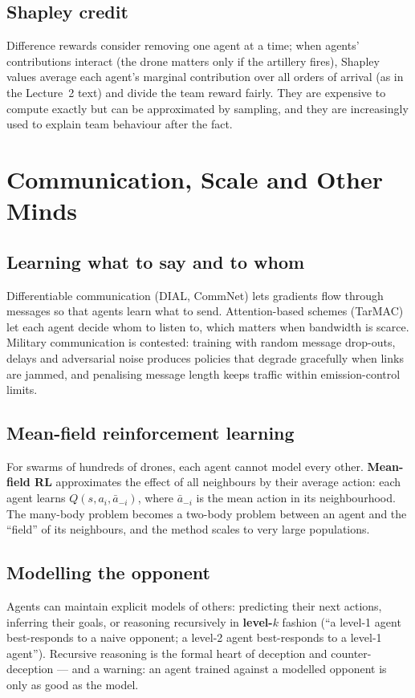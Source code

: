 \documentclass[11pt]{article}
\begin{document}
\subsection{Shapley credit}
Difference rewards consider removing one agent at a time; when agents' contributions interact (the drone matters only if the artillery fires), Shapley values average each agent's marginal contribution over all orders of arrival (as in the Lecture~2 text) and divide the team reward fairly. They are expensive to compute exactly but can be approximated by sampling, and they are increasingly used to explain team behaviour after the fact.

\section{Communication, Scale and Other Minds}
\subsection{Learning what to say and to whom}
Differentiable communication (DIAL, CommNet) lets gradients flow through messages so that agents learn what to send. Attention-based schemes (TarMAC) let each agent decide whom to listen to, which matters when bandwidth is scarce. Military communication is contested: training with random message drop-outs, delays and adversarial noise produces policies that degrade gracefully when links are jammed, and penalising message length keeps traffic within emission-control limits.
\subsection{Mean-field reinforcement learning}
For swarms of hundreds of drones, each agent cannot model every other. \textbf{Mean-field RL} approximates the effect of all neighbours by their average action: each agent learns $Q(s,a_i,\bar a_{-i})$, where $\bar a_{-i}$ is the mean action in its neighbourhood. The many-body problem becomes a two-body problem between an agent and the ``field'' of its neighbours, and the method scales to very large populations.
\subsection{Modelling the opponent}
Agents can maintain explicit models of others: predicting their next actions, inferring their goals, or reasoning recursively in \textbf{level-$k$} fashion (``a level-1 agent best-responds to a naive opponent; a level-2 agent best-responds to a level-1 agent''). Recursive reasoning is the formal heart of deception and counter-deception --- and a warning: an agent trained against a modelled opponent is only as good as the model.
\end{document}
